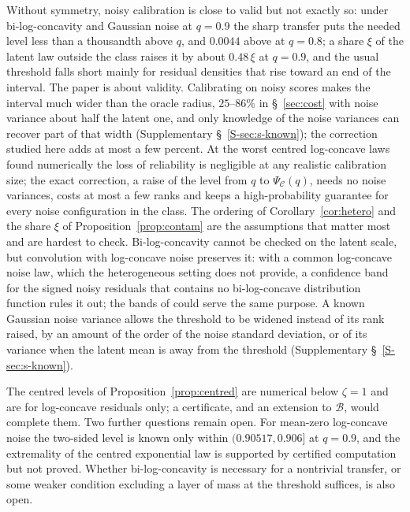 \documentclass[12pt]{article}
\theoremstyle{definition}
\newcommand{\B}{\mathcal{B}}
\newcommand{\E}{\mathcal{C}}
\begin{document}
Without symmetry, noisy calibration is close to valid but not exactly so: under bi-log-concavity and Gaussian noise at $q = 0.9$ the sharp transfer puts the needed level less than a thousandth above $q$, and $0.0044$ above at $q = 0.8$; a share $\xi$ of the latent law outside the class raises it by about $0.48\,\xi$ at $q = 0.9$, and the usual threshold falls short mainly for residual densities that rise toward an end of the interval. The paper is about validity. Calibrating on noisy scores makes the interval much wider than the oracle radius, $25$--$86\%$ in \S~\ref{sec:cost} with noise variance about half the latent one, and only knowledge of the noise variances can recover part of that width (Supplementary \S~\ref{S-sec:s-known}); the correction studied here adds at most a few percent. At the worst centred log-concave laws found numerically the loss of reliability is negligible at any realistic calibration size; the exact correction, a raise of the level from $q$ to $\Psi_{\E}(q)$, needs no noise variances, costs at most a few ranks and keeps a high-probability guarantee for every noise configuration in the class. The ordering of Corollary~\ref{cor:hetero} and the share $\xi$ of Proposition~\ref{prop:contam} are the assumptions that matter most and are hardest to check. Bi-log-concavity cannot be checked on the latent scale, but convolution with log-concave noise preserves it: with a common log-concave noise law, which the heterogeneous setting does not provide, a confidence band for the signed noisy residuals that contains no bi-log-concave distribution function \citep*{dumbgen2017} rules it out; the bands of \citet*{laha2021} could serve the same purpose. A known Gaussian noise variance allows the threshold to be widened instead of its rank raised, by an amount of the order of the noise standard deviation, or of its variance when the latent mean is away from the threshold (Supplementary \S~\ref{S-sec:s-known}).

The centred levels of Proposition~\ref{prop:centred} are numerical below $\zeta = 1$ and are for log-concave residuals only; a certificate, and an extension to $\B$, would complete them. Two further questions remain open. For mean-zero log-concave noise the two-sided level is known only within $(0.90517, 0.906]$ at $q = 0.9$, and the extremality of the centred exponential law is supported by certified computation but not proved. Whether bi-log-concavity is necessary for a nontrivial transfer, or some weaker condition excluding a layer of mass at the threshold suffices, is also open.
\end{document}
